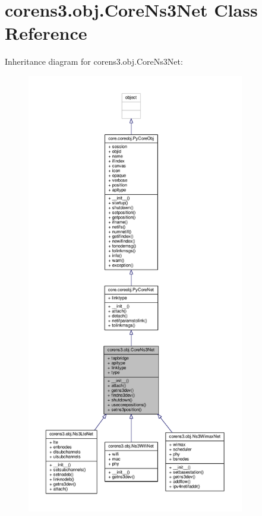 \hypertarget{classcorens3_1_1obj_1_1_core_ns3_net}{\section{corens3.\+obj.\+Core\+Ns3\+Net Class Reference}
\label{classcorens3_1_1obj_1_1_core_ns3_net}
}


Inheritance diagram for corens3.\+obj.\+Core\+Ns3\+Net\+:
\nopagebreak
\begin{figure}[H]
\begin{center}
\leavevmode
\includegraphics[height=550pt]{classcorens3_1_1obj_1_1_core_ns3_net__inherit__graph}
\end{center}
\end{figure}


